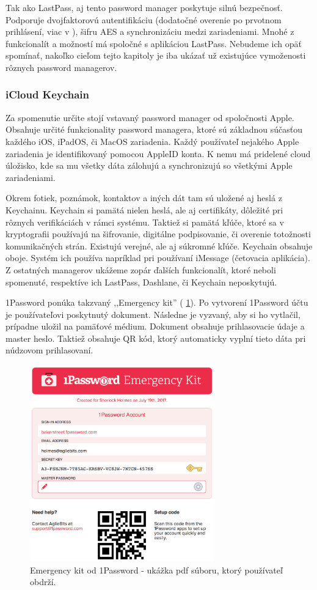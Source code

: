 Tak ako LastPass, aj tento password manager poskytuje silnú bezpečnosť. Podporuje dvojfaktorovú autentifikáciu (dodatočné overenie po prvotnom prihlásení, viac v \cite{2fa}), šifru AES a synchronizáciu medzi zariadeniami. Mnohé z funkcionalít a možností má spoločné s aplikáciou LastPass. Nebudeme ich opäť spomínať, nakoľko cieľom tejto kapitoly je iba ukázať už existujúce vymoženosti rôznych password managerov.

\subsubsection{iCloud Keychain}
Za spomenutie určite stojí vstavaný password manager od spoločnosti Apple. Obsahuje určité funkcionality password managera, ktoré sú základnou súčasťou každého iOS, iPadOS, či MacOS zariadenia. Každý používateľ nejakého Apple zariadenia je identifikovaný pomocou AppleID konta. K nemu má pridelené cloud úložisko, kde sa mu všetky dáta zálohujú a synchronizujú so všetkými Apple zariadeniami.

Okrem fotiek, poznámok, kontaktov a iných dát tam sú uložené aj heslá z Keychainu. Keychain si pamätá nielen heslá, ale aj certifikáty, dôležité pri rôznych verifikáciách v rámci systému. Taktiež si pamätá kľúče, ktoré sa v kryptografii používajú na šifrovanie, digitálne podpisovanie, či overenie totožnosti komunikačných strán. Existujú verejné, ale aj súkromné kľúče. Keychain obsahuje oboje. Systém ich používa napríklad pri používaní iMessage (četovacia aplikácia). \\

Z ostatných managerov ukážeme zopár ďalších funkcionalít, ktoré neboli spomenuté, respektíve ich LastPass, Dashlane, či Keychain neposkytujú.

1Password ponúka takzvaný ,,Emergency kit'' (\figurename{ \ref{emergencykit}}). Po vytvorení 1Password účtu je používateľovi poskytnutý dokument. Následne je vyzvaný, aby si ho vytlačil, prípadne uložil na pamäťové médium. Dokument obsahuje prihlasovacie údaje a master heslo. Taktiež obsahuje QR kód, ktorý automaticky vyplní tieto dáta pri núdzovom prihlasovaní.

\begin{figure}[ht]
  \centering
  \includegraphics[width=8cm]{img/1pass.png}
  \caption{Emergency kit od 1Password - ukážka pdf súboru, ktorý používateľ obdrží.}
  \label{emergencykit}
\end{figure}

